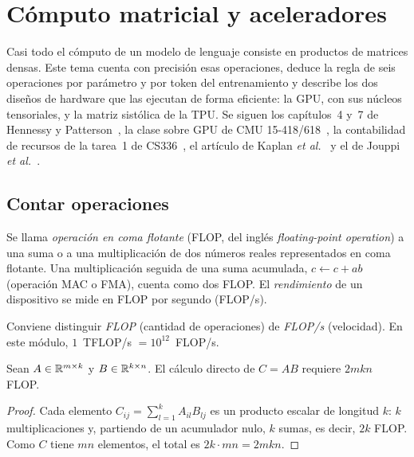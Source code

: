\chapter{Cómputo matricial y aceleradores}
\label{tema:1}

Casi todo el cómputo de un modelo de lenguaje consiste en productos de matrices densas. Este tema cuenta con precisión esas operaciones, deduce la regla de seis operaciones por parámetro y por token del entrenamiento y describe los dos diseños de hardware que las ejecutan de forma eficiente: la GPU, con sus núcleos tensoriales, y la matriz sistólica de la TPU. Se siguen los capítulos~4 y~7 de Hennessy y Patterson~\cite{hp}, la clase sobre GPU de CMU 15-418/618~\cite{cmu418}, la contabilidad de recursos de la tarea~1 de CS336~\cite[§3.5]{cs336a1}, el artículo de Kaplan \emph{et al.}~\cite[§2.1]{kaplan} y el de Jouppi \emph{et al.}~\cite{jouppi}.

\section{Contar operaciones}

\begin{definicion}[FLOP]
Se llama \emph{operación en coma flotante} (FLOP, del inglés \emph{floating-point operation}) a una suma o a una multiplicación de dos números reales representados en coma flotante. Una multiplicación seguida de una suma acumulada, $c\gets c+ab$ (operación MAC o FMA), cuenta como dos FLOP. El \emph{rendimiento} de un dispositivo se mide en FLOP por segundo (FLOP/s).
\end{definicion}

Conviene distinguir \emph{FLOP} (cantidad de operaciones) de \emph{FLOP/s} (velocidad). En este módulo, $1$~TFLOP/s $=10^{12}$~FLOP/s.

\begin{proposicion}\label{prop:flop-matmul}
Sean $A\in\mathbb{R}^{m\times k}$ y $B\in\mathbb{R}^{k\times n}$. El cálculo directo de $C=AB$ requiere $2mkn$ FLOP.
\end{proposicion}

\begin{proof}
Cada elemento $C_{ij}=\sum_{l=1}^{k}A_{il}B_{lj}$ es un producto escalar de longitud $k$: $k$ multiplicaciones y, partiendo de un acumulador nulo, $k$ sumas, es decir, $2k$ FLOP. Como $C$ tiene $mn$ elementos, el total es $2k\cdot mn=2mkn$.
\end{proof}

